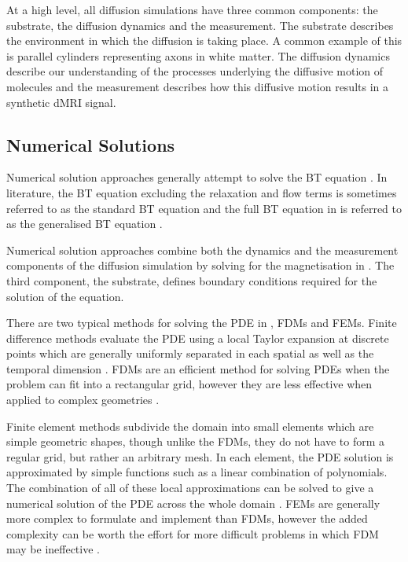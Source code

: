 At a high level, all diffusion simulations have three common components: the substrate, the diffusion dynamics and the measurement.
The substrate describes the environment in which the diffusion is taking place. A common example of this is parallel cylinders representing axons in white matter.
The diffusion dynamics describe our understanding of the processes underlying the diffusive motion of molecules and the measurement describes how this diffusive motion results in a synthetic \ac{dMRI} signal.
\subsection{Numerical Solutions}
\label{sec:numerical_solutions}
Numerical solution approaches generally attempt to solve the \acl{BT} equation \cite{Torrey1956}.
In literature, the \ac{BT} equation excluding the relaxation and flow terms is sometimes referred to as the standard \ac{BT} equation and the full \ac{BT} equation in  is referred to as the generalised \ac{BT} equation \cite{Beltrachini2016}. 

Numerical solution approaches combine both the dynamics and the measurement components of the diffusion simulation by solving for the magnetisation in  .
The third component, the substrate, defines boundary conditions required for the solution of the equation. 

There are two typical methods for solving the \ac{PDE} in , \acp{FDM} and \acp{FEM}.
Finite difference methods evaluate the \ac{PDE} using a local Taylor expansion at discrete points which are generally uniformly separated in each spatial as well as the temporal dimension \cite{Grossmann2007}.
\acp{FDM} are an efficient method for solving \acp{PDE} when the problem can fit into a rectangular grid, however they are less effective when applied to complex geometries \cite{Hagslatt2003, Grossmann2007}.

Finite element methods subdivide the domain into small elements which are simple geometric shapes, though unlike the \acp{FDM}, they do not have to form a regular grid, but rather an arbitrary mesh.
In each element, the \ac{PDE} solution is approximated by simple functions such as a linear combination of polynomials.
The combination of all of these local approximations can be solved to give a numerical solution of the \ac{PDE} across the whole domain \cite{Logan2007}.
\acp{FEM} are generally more complex to formulate and implement than \acp{FDM}, however the added complexity can be worth the effort for more difficult problems in which \ac{FDM} may be ineffective \cite{Iserles2009}.

